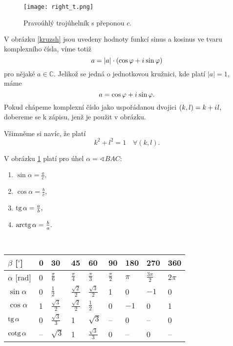 \begin{figure}[h!]
     \centering
     \texttt{[image: right\_t.png]}
     \caption{Pravoúhlý trojúhelník s přeponou $c.$}
     \label{prav_t}
\end{figure}

\pagebreak

\begin{pozn}
    \par V obrázku \ref{kruzsh} jsou uvedeny hodnoty funkcí sinus a kosinus ve tvaru
    komplexního čísla, víme totiž
    $$ a = | a | \cdot (\cos \varphi + i\mkern1mu \sin \varphi)$$
    pro nějaké $a \in \mathbb C.$ Jelikož se jedná o jednotkovou kružnici, kde platí
    $|a| = 1,$ máme
    $$a=\cos \varphi +i\mkern1mu \sin \varphi. $$
    Pokud chápeme komplexní číslo jako uspořádanou dvojici $(k,l)=k+i\mkern1mu l,$
    dobereme se k zápisu, jenž je použit v obrázku.
    \par Všimněme si navíc, že platí
    $$k^2+l^2=1 \,\,\,\,\,\, \forall (k,l).$$
\end{pozn}

\begin{pozn}
    V obrázku \ref{prav_t} platí pro úhel $\alpha = \sphericalangle BAC:$
    \begin{enumerate}[$i.$]
        \item $\sin \alpha= \frac{a}{c},$
        \item $\cos \alpha= \frac{b}{c},$
        \item $\operatorname{tg} \alpha= \frac{a}{b},$
        \item $\operatorname{arctg} \alpha= \frac{b}{a}.$
    \end{enumerate}
\end{pozn}

\begin{pozn}\,\\
    \begin{tabularx}{\textwidth}{| p{} || p{} | p{} |
    p{} | p{} | p{} | p{} | p{}
    | p{} |}
    \hline
    $\beta$ [$^\circ$] & 0 & 30 & 45 & 60 & 90 & 180 & 270 & 360 \\
    \hline
    $\alpha$ [rad] & 0 & $\frac{\pi}{6}$ & $\frac{\pi}{4}$ & $\frac{\pi}{3}$ & $\frac{\pi}{2}$ & $\pi$ & $\frac{3\pi}{2}$ & $2\pi$\\
    \hline
    $\sin \alpha$ & 0 & $\frac{1}{2}$ & $\frac{\sqrt{2}}{2}$ & $\frac{\sqrt{3}}{2}$ & 1 & 0 & $-1$ & 0\\
    \hline
    $\cos \alpha$ & 1 & $\frac{\sqrt{3}}{2}$ & $\frac{\sqrt{2}}{2}$ & $\frac{1}{2}$ & 0 & $-1$ & 0 & 1\\
    \hline
    $\operatorname{tg} \alpha$ & 0 & $\frac{\sqrt{3}}{3}$ & 1 & $\sqrt{3}$ & -- & 0 & -- & 0\\
    \hline
    $\operatorname{cotg} \alpha$ & -- & $\sqrt{3}$ & 1 & $\frac{\sqrt{3}}{3}$ & 0 & -- & 0 & --\\
    \hline
    \end{tabularx}
\end{pozn}

